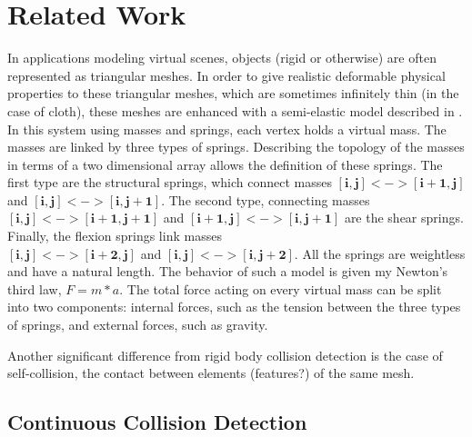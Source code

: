 \chapter{Related Work}
\label{chapter:sota}

In applications modeling virtual scenes, objects (rigid or otherwise) are often represented as triangular meshes. In order to give realistic deformable physical properties to these triangular meshes, which are sometimes infinitely thin (in the case of cloth), these meshes are enhanced with a semi-elastic model described in \cite{provot95}. In this system using masses and springs, each vertex holds a virtual mass. The masses are linked by three types of springs. Describing the topology of the masses in terms of a two dimensional array allows the definition of these springs. The first type are the structural springs, which connect masses $\mathbf{[i, j] <-> [i + 1, j]}$ and $\mathbf{[i, j] <-> [i, j + 1]}$. The second type, connecting masses $\mathbf{[i, j] <-> [i + 1, j + 1]}$ and $\mathbf{[i + 1, j] <-> [i, j + 1]}$ are the shear springs. Finally, the flexion springs link masses\\
 $\mathbf{[i, j] <-> [i + 2, j]}$ and $\mathbf{[i, j] <-> [i, j + 2]}$. All the springs are weightless and have a natural length. The behavior of such a model is given my Newton's third law, $F = m * a$. The total force acting on every virtual mass can be split into two components: internal forces, such as the tension between the three types of springs, and external forces, such as gravity.

Another significant difference from rigid body collision detection is the case of self-collision, the contact between elements (features?) of the same mesh. 



\section{Continuous Collision Detection}
\label{sec:ccd}

